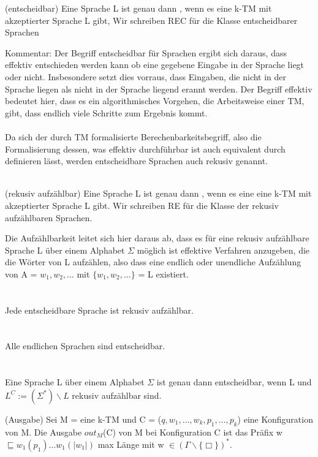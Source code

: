 \documentclass[a4paper]{article}
\begin{document}
\begin{DefBox}{(entscheidbar)}
 Eine Sprache L ist genau dann , wenn es eine  k-TM mit akzeptierter Sprache L gibt, Wir schreiben REC für die Klasse entscheidbarer Sprachen
 \end{DefBox}
 Kommentar: Der Begriff entscheidbar für Sprachen ergibt sich daraus, dass effektiv entschieden werden kann ob eine gegebene Eingabe in der Sprache liegt oder nicht. Insbesondere setzt dies vorraus, dass Eingaben, die nicht in der Sprache liegen  als nicht in der Sprache liegend erannt werden. Der Begriff effektiv bedeutet hier, dass es ein algorithmisches Vorgehen, die Arbeitsweise einer TM, gibt, dass endlich viele Schritte zum Ergebnis kommt. \\
 \\
 Da sich der durch TM formalisierte Berechenbarkeitsbegriff, also die Formalisierung dessen, was effektiv durchführbar ist auch equivalent durch  definieren lässt, werden entscheidbare Sprachen auch rekusiv genannt.  \\
 \\
 \begin{DefBox}{(rekusiv aufzählbar)}
  Eine Sprache L ist genau dann , wenn es eine eine k-TM mit akzeptierter Sprache L gibt. Wir schreiben RE für die Klasse der rekusiv aufzählbaren Sprachen.
 \end{DefBox}

 Die Aufzählbarkeit leitet sich hier daraus ab, dass es für eine rekusiv aufzählbare Sprache L über einem Alphabet $\Sigma$ möglich ist effektive Verfahren anzugeben, die die Wörter von L aufzählen, also dass eine endlich oder unendliche Aufzählung von A = $w_1,w_2,\dots$ mit $\lbrace w_1,w_2,\dots \rbrace$ = L existiert. \\
 \\
  \\ \stepBoxCounter
 Jede entscheidbare Sprache ist rekusiv aufzählbar. \\
 \\
  \\ \stepBoxCounter
 Alle endlichen Sprachen sind entscheidbar. \\
 \\
  \\ \stepBoxCounter
 Eine Sprache L über einem Alphabet $\Sigma$ ist genau dann entscheidbar, wenn L und $L^C := (\Sigma^*) \backslash L$ rekusiv aufzählbar sind.
 \begin{DefBox}{(Ausgabe)}
  Sei M = \TM eine k-TM und C = ($q,w_1,\dots,w_k,p_1,\dots,p_k$) eine Konfiguration von M. Die Ausgabe $out_M$(C) von M bei Konfiguration C ist das Präfix w $\sqsubseteq w_1(p_1)\dots w_1(|w_1|)$ max Länge mit w $\in (\Gamma \backslash \lbrace \Box \rbrace)^*$.
 \end{DefBox}
\end{document}
